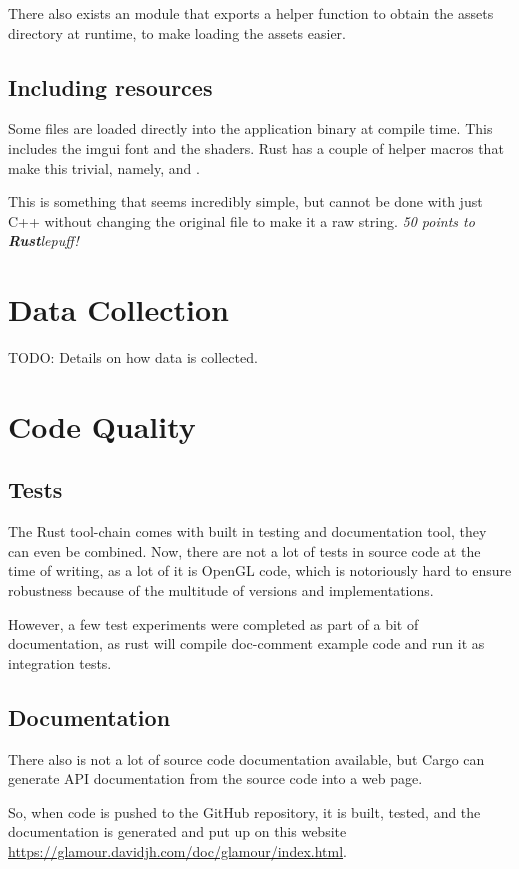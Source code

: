 There also exists an  module that exports a helper function  to obtain the assets directory at runtime, to make loading the assets easier.

\subsection{Including resources}
Some files are loaded directly into the application binary at compile time.
This includes the imgui font and the shaders.
Rust has a couple of helper macros that make this trivial, namely,  and .

This is something that seems incredibly simple, but cannot be done with just C++ without changing the original file to make it a raw string.
\emph{50 points to \textbf{Rust}lepuff!}

\section{Data Collection}

TODO: Details on how data is collected.

\section{Code Quality}

\subsection{Tests}
The Rust tool-chain comes with built in testing and documentation tool, they can even be combined.
Now, there are not a lot of tests in source code at the time of writing, as a lot of it is OpenGL code, which is notoriously hard to ensure robustness because of the multitude of versions and implementations.

However, a few test experiments were completed as part of a bit of documentation, as rust will compile doc-comment example code and run it as integration tests.

\subsection{Documentation}
There also is not a lot of source code documentation available, but Cargo can generate API documentation from the source code into a web page.

So, when code is pushed to the GitHub repository, it is built, tested, and the documentation is generated and put up on this website \url{https://glamour.davidjh.com/doc/glamour/index.html}.


